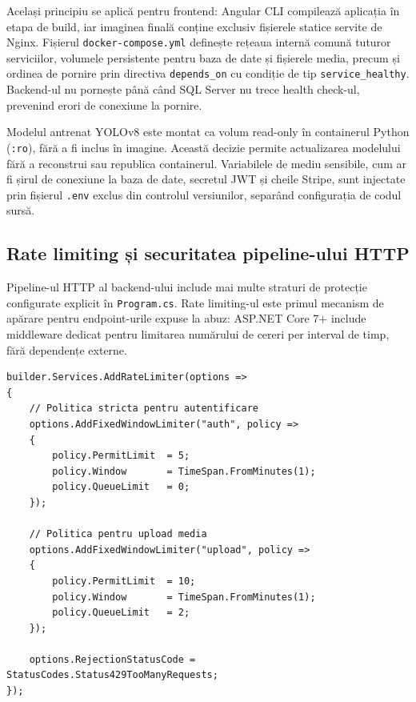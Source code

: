 Același principiu se aplică pentru frontend: Angular CLI compilează aplicația în etapa de build, iar imaginea finală conține exclusiv fișierele statice servite de Nginx. Fișierul \texttt{docker-compose.yml} definește rețeaua internă comună tuturor serviciilor, volumele persistente pentru baza de date și fișierele media, precum și ordinea de pornire prin directiva \texttt{depends\_on} cu condiție de tip \texttt{service\_healthy}. Backend-ul nu pornește până când SQL Server nu trece health check-ul, prevenind erori de conexiune la pornire.

Modelul antrenat YOLOv8 este montat ca volum read-only în containerul Python (\texttt{:ro}), fără a fi inclus în imagine. Această decizie permite actualizarea modelului fără a reconstrui sau republica containerul. Variabilele de mediu sensibile, cum ar fi șirul de conexiune la baza de date, secretul JWT și cheile Stripe, sunt injectate prin fișierul \texttt{.env} exclus din controlul versiunilor, separând configurația de codul sursă.

\subsection{Rate limiting și securitatea pipeline-ului HTTP}

Pipeline-ul HTTP al backend-ului include mai multe straturi de protecție configurate explicit în \texttt{Program.cs}. Rate limiting-ul este primul mecanism de apărare pentru endpoint-urile expuse la abuz: ASP.NET Core 7+ include middleware dedicat pentru limitarea numărului de cereri per interval de timp, fără dependențe externe.

\begin{lstlisting}[language={[Sharp]C}, caption={Configurarea rate limiting-ului cu politici diferențiate}]
builder.Services.AddRateLimiter(options =>
{
    // Politica stricta pentru autentificare
    options.AddFixedWindowLimiter("auth", policy =>
    {
        policy.PermitLimit  = 5;
        policy.Window       = TimeSpan.FromMinutes(1);
        policy.QueueLimit   = 0;
    });

    // Politica pentru upload media
    options.AddFixedWindowLimiter("upload", policy =>
    {
        policy.PermitLimit  = 10;
        policy.Window       = TimeSpan.FromMinutes(1);
        policy.QueueLimit   = 2;
    });

    options.RejectionStatusCode = StatusCodes.Status429TooManyRequests;
});
\end{lstlisting}

